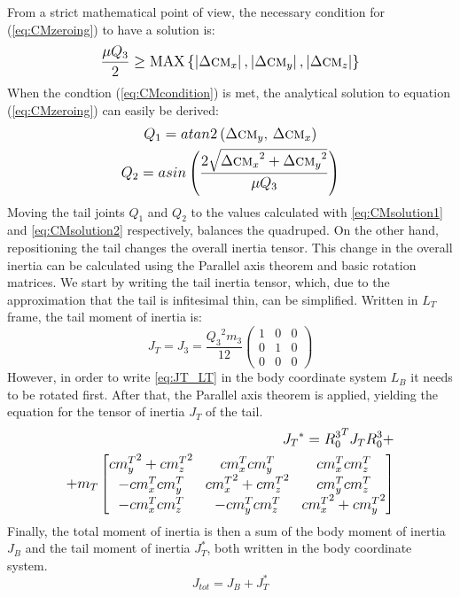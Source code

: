 From a strict mathematical point of view, the necessary condition for (\ref{eq:CMzeroing}) to have a solution is:
\begin{equation}\label{eq:CMcondition}
\frac{\mu Q_3}{2}\geq \textup{MAX}\left \{ \left | \Delta \textsc{cm}_x \right |, \left | \Delta \textsc{cm}_y \right |,\left | \Delta \textsc{cm}_z \right |\right \}
\end{equation}
When the condtion (\ref{eq:CMcondition}) is met, the analytical solution to equation (\ref{eq:CMzeroing}) can easily be derived:
\begin{gather}\label{eq:CMsolution1}
Q_1=atan2\left({\Delta \textsc{cm}_y},\, {\Delta \textsc{cm}_x}\right)\\
Q_2=asin\left(\frac{2\sqrt{{\Delta \textsc{cm}_x}^2+{\Delta \textsc{cm}_y}^2}}{\mu Q_3} \right)\label{eq:CMsolution2}
\end{gather}
Moving the tail joints $Q_1$ and $Q_2$ to the values calculated with \eqref{eq:CMsolution1} and \eqref{eq:CMsolution2} respectively, balances the quadruped. On the other hand, repositioning the tail changes the overall inertia tensor. This change in the overall inertia can be calculated using the Parallel axis theorem and basic rotation matrices. We start by writing the tail inertia tensor, which, due to the approximation that the tail is infitesimal thin, can be simplified. Written in $L_T$ frame, the tail moment of inertia is:
\begin{equation}\label{eq:JT_LT}
J_T=J_3=\frac{{Q_3}^2 m_3}{12}\left(
\begin{array}{ccc}
 1 & 0 & 0 \\
 0 & 1 & 0 \\
 0 & 0 & 0
\end{array}
\right)
\end{equation}
However, in order to write \eqref{eq:JT_LT} in the body coordinate system $L_B$ it needs to be rotated first. After that, the Parallel axis theorem is applied, yielding the equation for the tensor of inertia $J_T$ of the tail. 
\begin{equation}
\begin{aligned}
\scriptsize
{J_T}^*={R_0^3}^TJ_TR_0^3+\\+m_T\begin{bmatrix}
{cm_y^T}^2 +{cm_z^T}^2& {cm_x^T}{cm_y^T}& {cm_x^T}{cm_z^T} \\ 
-{cm_x^T}{cm_y^T} & {cm_x^T}^2+{cm_z^T}^2 & {cm_y^T}{cm_z^T}\\ 
-{cm_x^T}{cm_z^T} & -{cm_y^T}{cm_z^T} & {cm_x^T}^2+{cm_y^T}^2
\end{bmatrix}
\normalsize
\end{aligned}
\end{equation}
Finally, the total moment of inertia is then a sum of the body moment of inertia $J_B$ and the tail moment of inertia $J_T^*$, both written in the body coordinate system.
\begin{equation*}
J_{tot}=J_B+J_T^*
\end{equation*}
